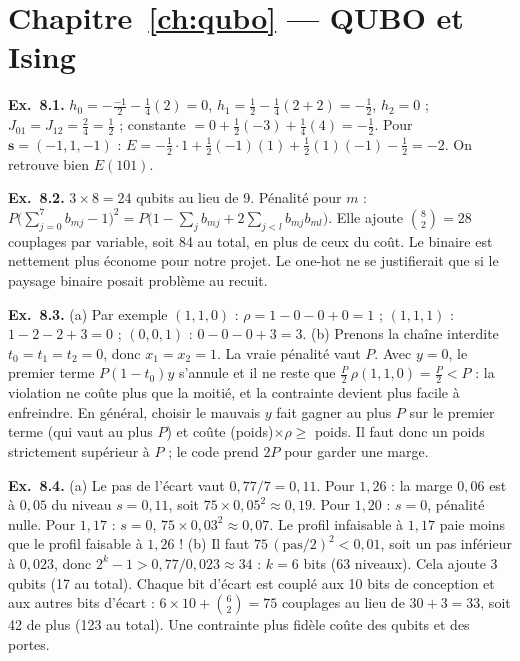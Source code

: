 \section*{Chapitre~\ref{ch:qubo} — QUBO et Ising}
\textbf{Ex.~8.1.} $h_0=-\tfrac{-1}2-\tfrac14(2)=0$, $h_1=\tfrac12-\tfrac14(2+2)=-\tfrac12$, $h_2=0$ ; $J_{01}=J_{12}=\tfrac24=\tfrac12$ ; constante $=0+\tfrac12(-3)+\tfrac14(4)=-\tfrac12$. Pour $\mathbf s=(-1,1,-1)$ : $E=-\tfrac12\cdot1+\tfrac12(-1)(1)+\tfrac12(1)(-1)-\tfrac12=-2$. On retrouve bien $E(101)$.

\textbf{Ex.~8.2.} $3\times8=24$ qubits au lieu de 9. Pénalité pour $m$ : $P\big(\sum_{j=0}^7b_{mj}-1\big)^2=P\big(1-\sum_jb_{mj}+2\sum_{j<l}b_{mj}b_{ml}\big)$. Elle ajoute $\binom82=28$ couplages par variable, soit 84 au total, en plus de ceux du coût. Le binaire est nettement plus économe pour notre projet. Le one-hot ne se justifierait que si le paysage binaire posait problème au recuit.

\textbf{Ex.~8.3.} (a) Par exemple $(1,1,0)$ : $\rho=1-0-0+0=1$ ; $(1,1,1)$ : $1-2-2+3=0$ ; $(0,0,1)$ : $0-0-0+3=3$. (b) Prenons la chaîne interdite $t_0=t_1=t_2=0$, donc $x_1=x_2=1$. La vraie pénalité vaut $P$. Avec $y=0$, le premier terme $P(1-t_0)y$ s'annule et il ne reste que $\tfrac P2\,\rho(1,1,0)=\tfrac P2<P$ : la violation ne coûte plus que la moitié, et la contrainte devient plus facile à enfreindre. En général, choisir le mauvais $y$ fait gagner au plus $P$ sur le premier terme (qui vaut au plus $P$) et coûte (poids)$\times\rho\ge$ poids. Il faut donc un poids strictement supérieur à $P$ ; le code prend $2P$ pour garder une marge.

\textbf{Ex.~8.4.} (a) Le pas de l'écart vaut $0{,}77/7=0{,}11$. Pour $1{,}26$ : la marge $0{,}06$ est à $0{,}05$ du niveau $s=0{,}11$, soit $75\times0{,}05^2\approx0{,}19$. Pour $1{,}20$ : $s=0$, pénalité nulle. Pour $1{,}17$ : $s=0$, $75\times0{,}03^2\approx0{,}07$. Le profil infaisable à $1{,}17$ paie moins que le profil faisable à $1{,}26$ ! (b) Il faut $75\,(\text{pas}/2)^2<0{,}01$, soit un pas inférieur à $0{,}023$, donc $2^k-1>0{,}77/0{,}023\approx34$ : $k=6$ bits (63 niveaux). Cela ajoute 3 qubits (17 au total). Chaque bit d'écart est couplé aux 10 bits de conception et aux autres bits d'écart : $6\times10+\binom62=75$ couplages au lieu de $30+3=33$, soit 42 de plus (123 au total). Une contrainte plus fidèle coûte des qubits et des portes.

